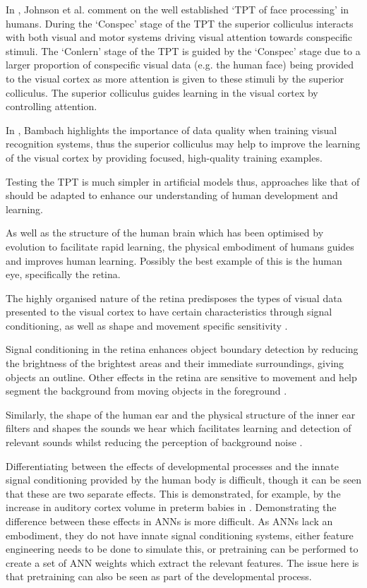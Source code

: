 In \cite{johnson2015two}, Johnson et al. comment on the well established `\ac{TPT} of face processing' in humans.  During the `Conspec' stage of the \ac{TPT} the superior colliculus interacts with both visual and motor systems driving visual attention towards conspecific stimuli. The `Conlern' stage of the \ac{TPT} is guided by the `Conspec' stage due to a larger proportion of conspecific visual data  (e.g. the human face) being provided to the visual cortex as more attention is given to these stimuli by the superior colliculus. 
The superior colliculus guides learning in the visual cortex by controlling attention.

In \cite{bambach2017egocentric}, Bambach highlights the importance of data quality when training visual recognition systems, thus the superior colliculus may help to improve the learning of the visual cortex by providing focused, high-quality training examples. 

Testing the \ac{TPT} is much simpler in artificial models thus, approaches like that of \cite{bambach2017egocentric} should be adapted to enhance our understanding of human development and learning.

As well as the structure of the human brain which has been optimised by evolution to facilitate rapid learning, the physical embodiment of humans guides and improves human learning. Possibly the best example of this is the human eye, specifically the retina.

The highly organised nature of the retina predisposes the types of visual data presented to the visual cortex to have certain characteristics through signal conditioning, as well as shape and movement specific sensitivity \cite{masland2012neuronal}.

Signal conditioning in the retina enhances object boundary detection by reducing the brightness of the brightest areas and their immediate surroundings, giving objects an outline. Other effects in the retina are sensitive to movement and help segment the background from moving objects in the foreground \cite{olveczky2003segregation}.

Similarly, the shape of the human ear and the physical structure of the inner ear filters and shapes the sounds we hear which facilitates learning and detection of relevant sounds whilst reducing the perception of background noise \cite{oxenham2018we}.

Differentiating between the effects of developmental processes and the innate signal conditioning provided by the human body is difficult, though it can be seen that these are two separate effects. This is demonstrated, for example, by the increase in auditory cortex volume in preterm babies in \cite{webb2015mother}. Demonstrating the difference between these effects in \acp{ANN} is more difficult. As \acp{ANN} lack an embodiment, they do not have innate signal conditioning systems, either feature engineering needs to be done to simulate this, or pretraining can be performed to create a set of \ac{ANN} weights which extract the relevant features. The issue here is that pretraining can also be seen as part of the developmental process.

